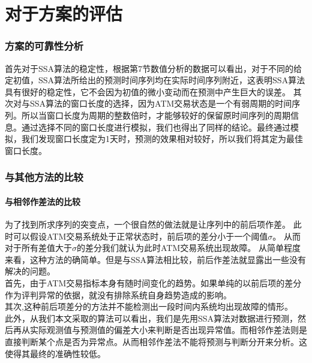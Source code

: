 \documentclass[a4paper]{article}
\begin{document}
\part{对于方案的评估}
\section{方案的可靠性分析}
\indent 首先对于SSA算法的稳定性，根据第7节数值分析的数据可以看出，对于不同的给定初值，SSA算法所给出的预测时间序列均在实际时间序列附近，这表明SSA算法具有很好的稳定性，它不会因为初值的微小变动而在预测中产生巨大的误差。
\indent 其次对与SSA算法的窗口长度的选择，因为ATM交易状态是一个有弱周期的时间序列。所以当窗口长度为周期的整数倍时，才能够较好的保留原时间序列的周期信息。通过选择不同的窗口长度进行模拟，我们也得出了同样的结论。最终通过模拟，我们发现窗口长度定为1天时，预测的效果相对较好，所以我们将其定为最佳窗口长度。
\section{与其他方法的比较}
\subsection{与相邻作差法的比较}
\indent 为了找到所求序列的突变点，一个很自然的做法就是让序列中的前后项作差。
此时可以假设ATM交易系统处于正常状态时，前后项的差分小于一个阈值$\sigma$。
从而对于所有差值大于$\sigma$的差分我们就认为此时ATM交易系统出现故障。
从简单程度来看，这种方法的确简单。但是与SSA算法相比较，前后作差法就显露出一些没有解决的问题。\\
\indent 首先，由于ATM交易指标本身有随时间变化的趋势。如果单纯的以前后项的差分作为评判异常的依据，就没有排除系统自身趋势造成的影响。\\
\indent 其次,这种前后项差分的方法并不能检测出一段时间内系统均出现故障的情形。 \\
\indent 此外，从我们本文采取的算法可以看出，我们是先用SSA算法对数据进行预测，然后再从实际观测值与预测值的偏差大小来判断是否出现异常值。而相邻作差法则是直接判断某个点是否为异常点。从而相邻作差法不能将预测与判断分开来分析。这使得其最终的准确性较低。
\end{document}
